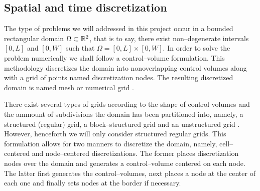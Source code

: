 
\subsection{Spatial and time discretization}

The type of problems we will addressed in this project occur in a bounded
rectangular domain $\Omega \subset \mathbb{R}^2$, that is to say, there exist
non--degenerate intervals $[0, L]$ and $[0, W]$ such that
$\Omega = [0, L] \times [0, W]$. In order to solve the problem numerically we shall
follow a control--volume formulation. This methodology discretizes
the domain into nonoverlapping control volumes along with a grid of points named
discretization nodes. The resulting discretized domain is named mesh or
numerical grid \cite{patankar2008numerical}.

There exist several types of grids according to the shape of control volumes and
the ammount of subdivisions the domain has been partitioned into, namely, a
structured (regular) grid, a block--structured grid and an unstructured grid
\cite{ferziger2002computational2grid}. However, henceforth we will only consider
structured regular grids. This formulation allows for two manners to discretize
the domain, namely, cell--centered and node--centered discretizations. The
former places discretization nodes over the domain and generates a
control--volume centered on each node. The latter first generates the
control--volumes, next places a node at the center of each one and finally sets
nodes at the border if necessary.

